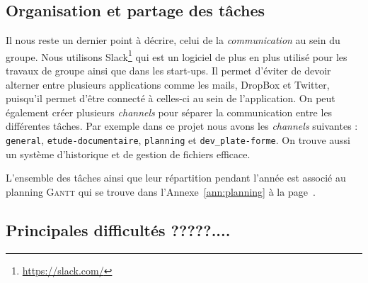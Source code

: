 \subsection{Organisation et partage des tâches}
Il nous reste un dernier point à décrire, celui de la \emph{communication}
au sein du groupe.
Nous utilisons Slack\footnote{\url{https://slack.com/}} qui est un logiciel
de plus en plus utilisé pour les travaux de groupe ainsi que dans les start-ups.
Il permet d'éviter de devoir alterner entre plusieurs applications comme les mails,
DropBox et Twitter, puisqu'il permet d'être connecté
à celles-ci au sein de l'application.
On peut également créer plusieurs \emph{channels} pour séparer la communication
entre les différentes tâches.
Par exemple dans ce projet nous avons les \emph{channels} suivantes :
\texttt{general}, \texttt{etude-documentaire}, 
\texttt{planning} et \texttt{dev\_plate-forme}.
On trouve aussi un système d'historique et de gestion de fichiers efficace.

L'ensemble des tâches ainsi que leur répartition pendant l'année
est associé au planning \textsc{Gantt} qui se trouve
dans l'Annexe~\ref{ann:planning} à la page~\pageref{ann:planning}.

\subsection{Principales difficultés ?????....}